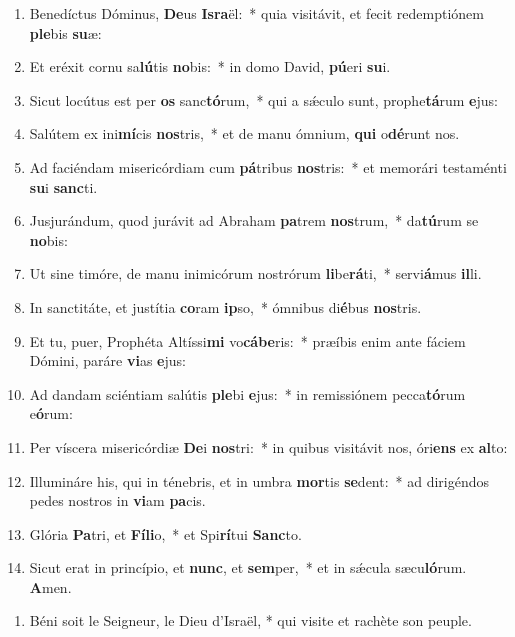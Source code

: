 \documentclass[twoside]{article}
\begin{document}
\begin{paracol}[1]{2}
\begin{enumerate}[wide, itemsep=0mm, labelwidth=!, labelindent=0pt, label=\color{gregoriocolor}\theenumi]
\item Benedíctus Dóminus, \textbf{De}us \textbf{Is}\textbf{ra}ël:~* quia visitávit, et fecit redemptiónem \textbf{ple}bis \textbf{su}æ:
\item Et eréxit cornu sa\textbf{lú}tis \textbf{no}bis:~* in domo David, \textbf{pú}eri \textbf{su}i.
\item Sicut locútus est per \textbf{os} sanc\textbf{tó}rum,~* qui a sǽculo sunt, prophe\textbf{tá}rum \textbf{e}jus:
\item Salútem ex ini\textbf{mí}cis \textbf{nos}tris,~* et de manu ómnium, \textbf{qui} o\textbf{dé}runt nos.
\item Ad faciéndam misericórdiam cum \textbf{pá}tribus \textbf{nos}tris:~* et memorári testaménti \textbf{su}i \textbf{sanc}ti.
\item Jusjurándum, quod jurávit ad Abraham \textbf{pa}trem \textbf{nos}trum,~* da\textbf{tú}rum se \textbf{no}bis:
\item Ut sine timóre, de manu inimicórum nostrórum \textbf{li}be\textbf{rá}ti,~* servi\textbf{á}mus \textbf{il}li.
\item In sanctitáte, et justítia \textbf{co}ram \textbf{ip}so,~* ómnibus di\textbf{é}bus \textbf{nos}tris.
\item Et tu, puer, Prophéta Altíssi\textbf{mi} vo\textbf{cá}\textbf{be}ris:~* præíbis enim ante fáciem Dómini, paráre \textbf{vi}as \textbf{e}jus:
\item Ad dandam sciéntiam salútis \textbf{ple}bi \textbf{e}jus:~* in remissiónem pecca\textbf{tó}rum e\textbf{ó}rum:
\item Per víscera misericórdiæ \textbf{De}i \textbf{nos}tri:~* in quibus visitávit nos, óri\textbf{ens} ex \textbf{al}to:
\item Illumináre his, qui in ténebris, et in umbra \textbf{mor}tis \textbf{se}dent:~* ad dirigéndos pedes nostros in \textbf{vi}am \textbf{pa}cis.
\item Glória \textbf{Pa}tri, et \textbf{Fí}\textbf{li}o,~* et Spi\textbf{rí}tui \textbf{Sanc}to.
\item Sicut erat in princípio, et \textbf{nunc}, et \textbf{sem}per,~* et in sǽcula sæcu\textbf{ló}rum. \textbf{A}men.
\end{enumerate}
\switchcolumn
\begin{enumerate}[wide, itemsep=0mm, labelwidth=!, labelindent=0pt, label=\color{gregoriocolor}\theenumi]
\item Béni soit le Seigneur, le Dieu d'Israël, *
qui visite et rachète son peuple.


\end{enumerate}
\end{paracol}
\end{document}
